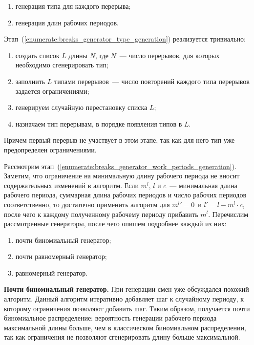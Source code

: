\documentclass[times,specification,annotation]{itmo-student-thesis}
\begin{document}
\begin{enumerate}
    \item \label{enumerate:breaks_generator_type_generation} генерация типа для каждого перерыва;
    \item \label{enumerate:breaks_generator_work_periods_generation} генерация длин рабочих периодов.
\end{enumerate}

Этап~(\ref{enumerate:breaks_generator_type_generation}) реализуется тривиально: 

\begin{enumerate}
    \item создать список $L$ длины $N$, где $N$~--- число перерывов, для которых необходимо сгенерировать тип;
    \item заполнить $L$ типами перерывов~--- число повторений каждого типа перерывов задается ограничениями;
    \item генерируем случайную перестановку списка $L$;
    \item назначаем тип перерывам, в порядке появления типов в $L$.
\end{enumerate}

Причем первый перерыв не участвует в этом этапе, так как для него тип уже предопределен ограничениями.

Рассмотрим этап~(\ref{enumerate:breaks_generator_work_periods_generation}).
Заметим, что ограничение на минимальную длину рабочего периода не вносит содержательных изменений в алгоритм.
Если $m^l$, $l$ и $c$~--- минимальная длина рабочего периода, суммарная длина рабочих периодов и число рабочих периодов соответственно, то достаточно применить алгоритм для $m^l' = 0$\, и $l' = l - m^l \cdot c$,\, после чего к каждому полученному рабочему периоду прибавить $m^l$.
Перечислим рассмотренные генераторы, после чего опишем подробнее каждый из них:

\begin{enumerate}
    \item почти биномиальный генератор;
    \item почти равномерный генератор;
    \item равномерный генератор.
\end{enumerate}

\textbf{Почти биномиальный генератор.}
При генерации смен уже обсуждался похожий алгоритм.
Данный алгоритм итеративно добавляет шаг к случайному периоду, к которому ограничения позволяют добавить шаг.
Таким образом, получается почти биномиальное распределение: вероятность генерации рабочего периода максимальной длины больше, чем в классическом биномиальном распределении, так как ограничения не позволяют сгенерировать длину больше максимальной.
\end{document}
